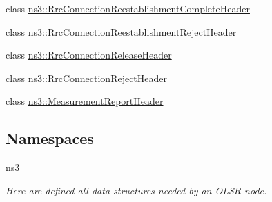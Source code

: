 \begin{DoxyCompactItemize}
\item 
class \hyperlink{classns3_1_1RrcConnectionReestablishmentCompleteHeader}{ns3\+::\+Rrc\+Connection\+Reestablishment\+Complete\+Header}
\item 
class \hyperlink{classns3_1_1RrcConnectionReestablishmentRejectHeader}{ns3\+::\+Rrc\+Connection\+Reestablishment\+Reject\+Header}
\item 
class \hyperlink{classns3_1_1RrcConnectionReleaseHeader}{ns3\+::\+Rrc\+Connection\+Release\+Header}
\item 
class \hyperlink{classns3_1_1RrcConnectionRejectHeader}{ns3\+::\+Rrc\+Connection\+Reject\+Header}
\item 
class \hyperlink{classns3_1_1MeasurementReportHeader}{ns3\+::\+Measurement\+Report\+Header}
\end{DoxyCompactItemize}
\subsection*{Namespaces}
\begin{DoxyCompactItemize}
\item 
 \hyperlink{namespacens3}{ns3}
\begin{DoxyCompactList}\small\item\em Here are defined all data structures needed by an O\+L\+SR node. \end{DoxyCompactList}\end{DoxyCompactItemize}
